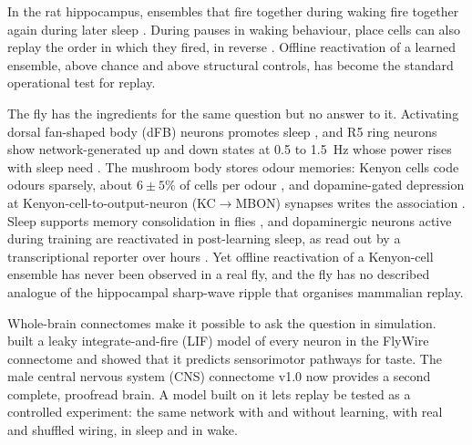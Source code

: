 \documentclass[11pt]{article}
\newcommand{\KCMBON}{KC$\rightarrow$MBON}
\begin{document}
In the rat hippocampus, ensembles that fire together during waking fire together again during later sleep \citep{wilson1994,kudrimoti1999}. During pauses in waking behaviour, place cells can also replay the order in which they fired, in reverse \citep{foster2006}. Offline reactivation of a learned ensemble, above chance and above structural controls, has become the standard operational test for replay.

The fly has the ingredients for the same question but no answer to it. Activating dorsal fan-shaped body (dFB) neurons promotes sleep \citep{donlea2014,pimentel2016}, and R5 ring neurons show network-generated up and down states at 0.5 to 1.5~Hz whose power rises with sleep need \citep{raccuglia2019}. The mushroom body stores odour memories: Kenyon cells code odours sparsely, about $6 \pm 5\%$ of cells per odour \citep{turner2008,honegger2011}, and dopamine-gated depression at Kenyon-cell-to-output-neuron (\KCMBON{}) synapses writes the association \citep{hige2015}. Sleep supports memory consolidation in flies \citep{haynes2015,berry2015}, and dopaminergic neurons active during training are reactivated in post-learning sleep, as read out by a transcriptional reporter over hours \citep{dag2019}. Yet offline reactivation of a Kenyon-cell ensemble has never been observed in a real fly, and the fly has no described analogue of the hippocampal sharp-wave ripple that organises mammalian replay.

Whole-brain connectomes make it possible to ask the question in simulation. \citet{shiu2024} built a leaky integrate-and-fire (LIF) model of every neuron in the FlyWire connectome \citep{dorkenwald2024} and showed that it predicts sensorimotor pathways for taste. The male central nervous system (CNS) connectome v1.0 \citep{berg2026} now provides a second complete, proofread brain. A model built on it lets replay be tested as a controlled experiment: the same network with and without learning, with real and shuffled wiring, in sleep and in wake.
\end{document}
